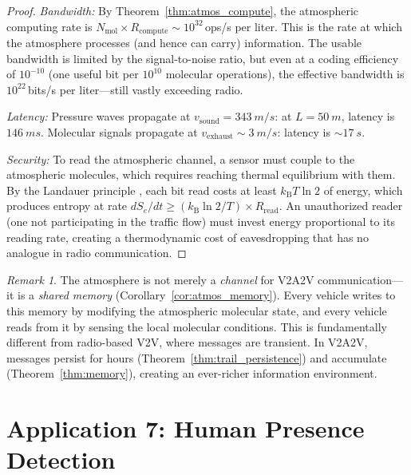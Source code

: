 \documentclass[11pt,twocolumn,a4paper]{article}
\theoremstyle{plain}
\theoremstyle{definition}
\theoremstyle{remark}
\newtheorem{remark}[theorem]{Remark}
\newcommand{\Se}{S_e}
\newcommand{\kB}{k_{\mathrm{B}}}
\newcommand{\Rcompute}{R_{\mathrm{compute}}}
\begin{document}
\begin{proof}
\emph{Bandwidth:} By Theorem~\ref{thm:atmos_compute}, the atmospheric computing rate is $N_{\mathrm{mol}} \times \Rcompute \sim 10^{32}$\,ops/s per liter. This is the rate at which the atmosphere processes (and hence can carry) information. The usable bandwidth is limited by the signal-to-noise ratio, but even at a coding efficiency of $10^{-10}$ (one useful bit per $10^{10}$ molecular operations), the effective bandwidth is $10^{22}$\,bits/s per liter---still vastly exceeding radio.

\emph{Latency:} Pressure waves propagate at $v_{\mathrm{sound}} = \SI{343}{m/s}$: at $L = \SI{50}{m}$, latency is $\SI{146}{ms}$. Molecular signals propagate at $v_{\mathrm{exhaust}} \sim \SI{3}{m/s}$: latency is $\sim \SI{17}{s}$.

\emph{Security:} To read the atmospheric channel, a sensor must couple to the atmospheric molecules, which requires reaching thermal equilibrium with them. By the Landauer principle \cite{landauer1961irreversibility}, each bit read costs at least $\kB T \ln 2$ of energy, which produces entropy at rate $d\Se/dt \geq (\kB \ln 2 / T) \times R_{\mathrm{read}}$. An unauthorized reader (one not participating in the traffic flow) must invest energy proportional to its reading rate, creating a thermodynamic cost of eavesdropping that has no analogue in radio communication.
\end{proof}

\begin{remark}
The atmosphere is not merely a \emph{channel} for V2A2V communication---it is a \emph{shared memory} (Corollary~\ref{cor:atmos_memory}). Every vehicle writes to this memory by modifying the atmospheric molecular state, and every vehicle reads from it by sensing the local molecular conditions. This is fundamentally different from radio-based V2V, where messages are transient. In V2A2V, messages persist for hours (Theorem~\ref{thm:trail_persistence}) and accumulate (Theorem~\ref{thm:memory}), creating an ever-richer information environment.
\end{remark}


\section{Application 7: Human Presence Detection}
\label{sec:human_detection}
\end{document}
